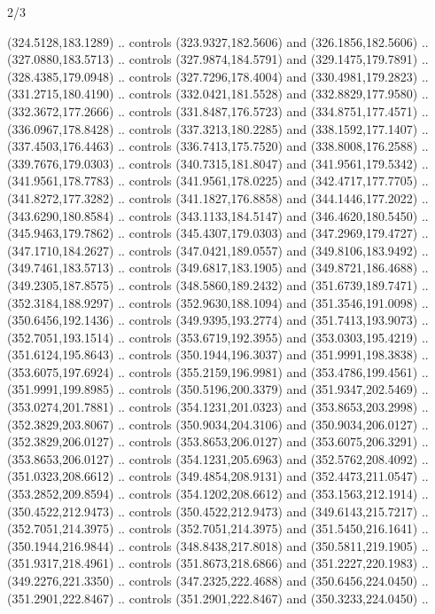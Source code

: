 \begin{flagdescription}{2/3}
\begin{scope}[xshift=0.5\flaglength,yshift=0.5\flagwidth,scale=\flagwidth/318.91]
\begin{scope}[y=0.8pt, x=0.8pt, yscale=-1,shift={(-298.97,-199.32)}]
  (324.5128,183.1289) .. controls (323.9327,182.5606) and (326.1856,182.5606) ..
  (327.0880,183.5713) .. controls (327.9874,184.5791) and (329.1475,179.7891) ..
  (328.4385,179.0948) .. controls (327.7296,178.4004) and (330.4981,179.2823) ..
  (331.2715,180.4190) .. controls (332.0421,181.5528) and (332.8829,177.9580) ..
  (332.3672,177.2666) .. controls (331.8487,176.5723) and (334.8751,177.4571) ..
  (336.0967,178.8428) .. controls (337.3213,180.2285) and (338.1592,177.1407) ..
  (337.4503,176.4463) .. controls (336.7413,175.7520) and (338.8008,176.2588) ..
  (339.7676,179.0303) .. controls (340.7315,181.8047) and (341.9561,179.5342) ..
  (341.9561,178.7783) .. controls (341.9561,178.0225) and (342.4717,177.7705) ..
  (341.8272,177.3282) .. controls (341.1827,176.8858) and (344.1446,177.2022) ..
  (343.6290,180.8584) .. controls (343.1133,184.5147) and (346.4620,180.5450) ..
  (345.9463,179.7862) .. controls (345.4307,179.0303) and (347.2969,179.4727) ..
  (347.1710,184.2627) .. controls (347.0421,189.0557) and (349.8106,183.9492) ..
  (349.7461,183.5713) .. controls (349.6817,183.1905) and (349.8721,186.4688) ..
  (349.2305,187.8575) .. controls (348.5860,189.2432) and (351.6739,189.7471) ..
  (352.3184,188.9297) .. controls (352.9630,188.1094) and (351.3546,191.0098) ..
  (350.6456,192.1436) .. controls (349.9395,193.2774) and (351.7413,193.9073) ..
  (352.7051,193.1514) .. controls (353.6719,192.3955) and (353.0303,195.4219) ..
  (351.6124,195.8643) .. controls (350.1944,196.3037) and (351.9991,198.3838) ..
  (353.6075,197.6924) .. controls (355.2159,196.9981) and (353.4786,199.4561) ..
  (351.9991,199.8985) .. controls (350.5196,200.3379) and (351.9347,202.5469) ..
  (353.0274,201.7881) .. controls (354.1231,201.0323) and (353.8653,203.2998) ..
  (352.3829,203.8067) .. controls (350.9034,204.3106) and (350.9034,206.0127) ..
  (352.3829,206.0127) .. controls (353.8653,206.0127) and (353.6075,206.3291) ..
  (353.8653,206.0127) .. controls (354.1231,205.6963) and (352.5762,208.4092) ..
  (351.0323,208.6612) .. controls (349.4854,208.9131) and (352.4473,211.0547) ..
  (353.2852,209.8594) .. controls (354.1202,208.6612) and (353.1563,212.1914) ..
  (350.4522,212.9473) .. controls (350.4522,212.9473) and (349.6143,215.7217) ..
  (352.7051,214.3975) .. controls (352.7051,214.3975) and (351.5450,216.1641) ..
  (350.1944,216.9844) .. controls (348.8438,217.8018) and (350.5811,219.1905) ..
  (351.9317,218.4961) .. controls (351.8673,218.6866) and (351.2227,220.1983) ..
  (349.2276,221.3350) .. controls (347.2325,222.4688) and (350.6456,224.0450) ..
  (351.2901,222.8467) .. controls (351.2901,222.8467) and (350.3233,224.0450) ..

\end{scope}
\end{scope}
\end{flagdescription}
